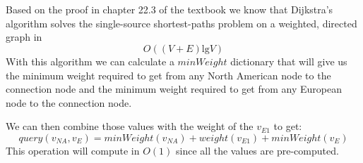 \section{}
Based on the proof in chapter 22.3 of the textbook we know that Dijkstra's algorithm solves the single-source shortest-paths problem on a weighted, directed graph in
\[O((V + E)\text{lg}V)\]
With this algorithm we can calculate a $minWeight$ dictionary that will give us the minimum weight required to get from any North American node to the connection node and the minimum weight required to get from any European node to the connection node.

We can then combine those values with the weight of the $v_{E1}$ to get:
\[query(v_{NA},v_{E}) = minWeight(v_{NA}) + weight(v_{E1}) + minWeight(v_{E})\]
This operation will compute in $O(1)$ since all the values are pre-computed.